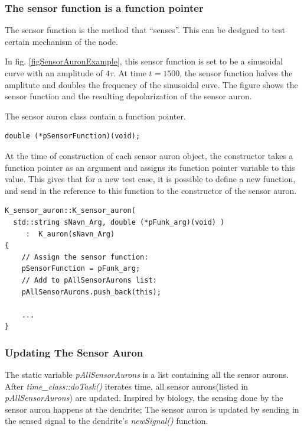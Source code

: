 	\subsubsection{The sensor function is a function pointer}
	The sensor function is the method that ``senses''.
	This can be designed to test certain mechanism of the node.
	
	In fig. \ref{figSensorAuronExample}, this sensor function is set to be a sinusoidal curve with an amplitude of $4 \tau$. 
	At time $t=1500$, the sensor function halves the amplitute and doubles the frequency of the sinusoidal cuve.
	The figure shows the sensor function and the resulting depolarization of the sensor auron.

	The sensor auron class contain a function pointer.
\begin{lstlisting}
double (*pSensorFunction)(void);
\end{lstlisting}
	At the time of construction of each sensor auron object, the constructor takes a function pointer as an argument and assigns its function pointer variable to this value.
	This gives that for a new test case, it is possible to define a new function, and send in the reference to this function to the constructor of the sensor auron.
\begin{lstlisting}
K_sensor_auron::K_sensor_auron(
  std::string sNavn_Arg, double (*pFunk_arg)(void) ) 
     :  K_auron(sNavn_Arg)
{
	// Assign the sensor function:
	pSensorFunction = pFunk_arg;
	// Add to pAllSensorAurons list:
	pAllSensorAurons.push_back(this);

	...
}
\end{lstlisting}

	\subsubsection{Updating The Sensor Auron}
	The static variable \emph{pAllSensorAurons} is a list containing all the sensor aurons.
	After \emph{time\_class::doTask()} iterates time, all sensor aurons(listed in \emph{pAllSensorAurons}) are updated.
	Inspired by biology, the sensing done by the sensor auron happens at the dendrite;
		The sensor auron is updated by sending in the sensed signal to the dendrite's \emph{newSignal()} function.









